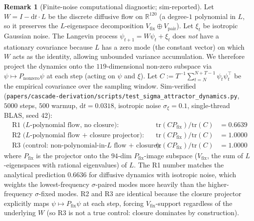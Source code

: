 \documentclass[11pt, a4paper]{amsart}
\theoremstyle{definition}
\newtheorem{remark}[theorem]{Remark}
\newcommand{\R}{\mathbb{R}}
\begin{document}
\begin{remark}[Finite-noise computational diagnostic; sim-reported]\label{rmk:dyn_attractor}
Let $W = I - \mathrm{d}t \cdot L$ be the discrete diffusive flow on
$\R^{120}$ (a degree-$1$ polynomial in $L$, so it preserves the
$L$-eigenspace decomposition $V_{\mathrm{fix}} \oplus V_{\mathrm{pair}}$).
Let $\xi_t$ be isotropic Gaussian noise.
The Langevin process $\psi_{t+1} = W\psi_t + \xi_t$ does \emph{not}
have a stationary covariance because $L$ has a zero mode (the
constant vector) on which $W$ acts as the identity, allowing
unbounded variance accumulation.  We therefore project the dynamics
onto the $119$-dimensional non-zero subspace via
$\psi \mapsto P_{\mathrm{nonzero}} \psi$ at each step (acting on
$\psi$ and $\xi$).  Let
$C := T^{-1} \sum_{t=N}^{N+T-1} \psi_t \psi_t^\top$
be the empirical covariance over the sampling window.
Sim-verified
(\texttt{papers/cascade-derivation/scripts/test\_sigma\_attractor\_dynamics.py},
$5000$ steps, $500$ warmup, $\mathrm{d}t = 0.0318$, isotropic noise
$\sigma_\xi = 0.1$, single-thread BLAS, seed 42):
\begin{align*}
&\text{R1 ($L$-polynomial flow, no closure):}
   &\mathrm{tr}(C P_\mathrm{fix}) / \mathrm{tr}(C) &= 0.6639 \\
&\text{R2 ($L$-polynomial flow + closure projector):}
   &\mathrm{tr}(C P_\mathrm{fix}) / \mathrm{tr}(C) &= 1.0000 \\
&\text{R3 (control: non-polynomial-in-$L$ flow + closure):}
   &\mathrm{tr}(C P_\mathrm{fix}) / \mathrm{tr}(C) &= 1.0000
\end{align*}
where $P_\mathrm{fix}$ is the projector onto the $94$-dim
$P_{\mathrm{fix}}$-image subspace ($V_{\mathrm{fix}}$, the sum of $L$-eigenspaces with rational eigenvalues) of $L$.  The R1 number
matches the analytical prediction $0.6636$ for diffusive dynamics
with isotropic noise, which weights the lowest-frequency
$\sigma$-paired modes more heavily than the higher-frequency
$\sigma$-fixed modes.  R2 and R3 are identical because the closure
projector explicitly maps $\psi \mapsto P_{\mathrm{fix}} \psi$ at
each step, forcing $V_{\mathrm{fix}}$-support regardless of the
underlying $W$ (so R3 is not a true control: closure dominates by
construction).
\end{remark}
\end{document}
